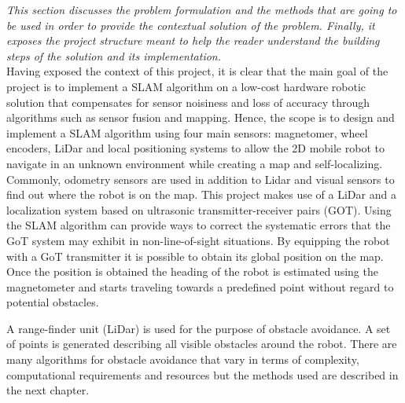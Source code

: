 
\label{section:methodology}


\textit{This section discusses the problem formulation and the methods that are going to be used in order to provide the contextual solution of the problem. Finally, it exposes the project structure meant to help the reader understand the building steps of the solution and its implementation. } \\%

Having exposed the context of this project, it is clear that the main goal of the project is to implement a SLAM algorithm on a low-cost hardware robotic solution that compensates for sensor noisiness and loss of accuracy through algorithms such as sensor fusion and mapping. Hence, the scope is to design and implement a SLAM algorithm using four main sensors: magnetomer, wheel encoders, LiDar and local positioning systems to allow the 2D mobile robot to navigate in an unknown environment while creating a map and self-localizing. \\
Commonly, odometry sensors are used in addition to Lidar and visual sensors to find out where the robot is on the map. This project makes use of a LiDar and a localization system based on ultrasonic transmitter-receiver pairs (GOT). Using the SLAM algorithm can provide ways to correct the systematic errors that the GoT system may exhibit in non-line-of-sight situations. By equipping the robot with a GoT transmitter it is possible to obtain its global position on the map. Once the position is obtained the heading of the robot is estimated using the magnetometer and starts traveling towards a predefined point without regard to potential obstacles.

\noindent A range-finder unit (LiDar) is used for the purpose of obstacle avoidance. A set of points is generated describing all visible obstacles around the robot. %
There are many algorithms for obstacle avoidance that vary in terms of complexity, computational requirements and resources but the methods used are described in the next chapter.\\

